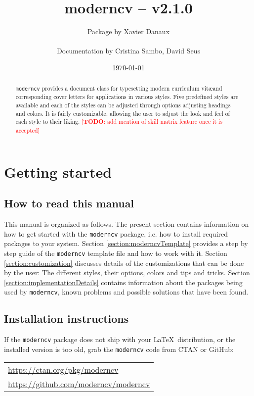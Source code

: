 \documentclass[a4paper,11pt]{article}
\title{\bfseries moderncv -- v2.1.0}
\author{Package by Xavier Danaux \\ \begin{small}Documentation by Cristina Sambo, David Seus \end{small}}
\date{\today}
\newcommand{\todox}[1]{\textcolor{red}{[\textbf{TODO:} #1]}}
\newcommand{\code}[1]{\lstinline!#1!}
\newcommand{\Code}[1]{\lstinline!#1! } %
\newcommand{\moderncv}{\code{moderncv}}
\newcommand{\Moderncv}{\Code{moderncv}}
\newcommand{\github}{GitHub}
\newcommand{\Ctan}{CTAN }
\newcommand{\moderncvGithub}{\url{https://github.com/moderncv/moderncv}}
\newcommand{\moderncvCtan}{\url{https://ctan.org/pkg/moderncv}}
\begin{document}
\maketitle
\begin{abstract}
\noindent 
\Moderncv provides a document class for typesetting modern curriculum vit\ae and corresponding cover letters 
for applications in various styles. 
Five predefined styles are available and each of the styles can be adjusted through options adjusting headings and colors.  
It is fairly customizable, allowing the user to adjust the look and feel of each style to their liking.
\todox{add mention of skill matrix feature once it is accepted}
\end{abstract}
\tableofcontents

\section{Getting started}
\subsection{How to read this manual}
This manual is organized as follows.
The present section contains information on how to get started with the \Moderncv 
package, i.e. how to install required packages to your system.
% 
% 
Section \ref{section:moderncvTemplate} provides a step by step guide of the \Moderncv template file and how to work with it. 
% 
Section \ref{section:customization} discusses details of the customizations that can be done by the user: 
The different styles, their options, colors and tips and tricks.
% 
Section \ref{section:implementationDetails} contains information about the packages being used by \moderncv, 
known problems and possible solutions that have been found. 

\subsection{Installation instructions}
If the \Moderncv package does not ship with your \LaTeX\ distribution, or the installed version is too old, 
grab the \Moderncv code from \Ctan or \github: \medskip

\begin{tabular}{l}
    \moderncvCtan \\%
    \moderncvGithub
\end{tabular}
\end{document}
